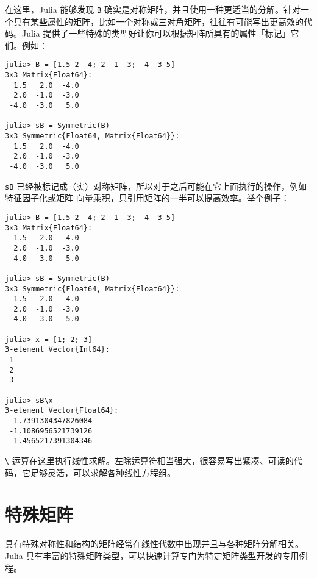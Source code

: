 在这里，Julia 能够发现 \texttt{B} 确实是对称矩阵，并且使用一种更适当的分解。针对一个具有某些属性的矩阵，比如一个对称或三对角矩阵，往往有可能写出更高效的代码。Julia 提供了一些特殊的类型好让你可以根据矩阵所具有的属性「标记」它们。例如：




\begin{verbatim}
julia> B = [1.5 2 -4; 2 -1 -3; -4 -3 5]
3×3 Matrix{Float64}:
  1.5   2.0  -4.0
  2.0  -1.0  -3.0
 -4.0  -3.0   5.0

julia> sB = Symmetric(B)
3×3 Symmetric{Float64, Matrix{Float64}}:
  1.5   2.0  -4.0
  2.0  -1.0  -3.0
 -4.0  -3.0   5.0
\end{verbatim}



\texttt{sB} 已经被标记成（实）对称矩阵，所以对于之后可能在它上面执行的操作，例如特征因子化或矩阵-向量乘积，只引用矩阵的一半可以提高效率。举个例子：




\begin{verbatim}
julia> B = [1.5 2 -4; 2 -1 -3; -4 -3 5]
3×3 Matrix{Float64}:
  1.5   2.0  -4.0
  2.0  -1.0  -3.0
 -4.0  -3.0   5.0

julia> sB = Symmetric(B)
3×3 Symmetric{Float64, Matrix{Float64}}:
  1.5   2.0  -4.0
  2.0  -1.0  -3.0
 -4.0  -3.0   5.0

julia> x = [1; 2; 3]
3-element Vector{Int64}:
 1
 2
 3

julia> sB\x
3-element Vector{Float64}:
 -1.7391304347826084
 -1.1086956521739126
 -1.4565217391304346
\end{verbatim}



\texttt{{\textbackslash}} 运算在这里执行线性求解。左除运算符相当强大，很容易写出紧凑、可读的代码，它足够灵活，可以求解各种线性方程组。



\hypertarget{16591042520207219529}{}


\section{特殊矩阵}



\href{http://www2.imm.dtu.dk/pubdb/views/publication\_details.php?id=3274}{具有特殊对称性和结构的矩阵}经常在线性代数中出现并且与各种矩阵分解相关。 Julia 具有丰富的特殊矩阵类型，可以快速计算专门为特定矩阵类型开发的专用例程。




